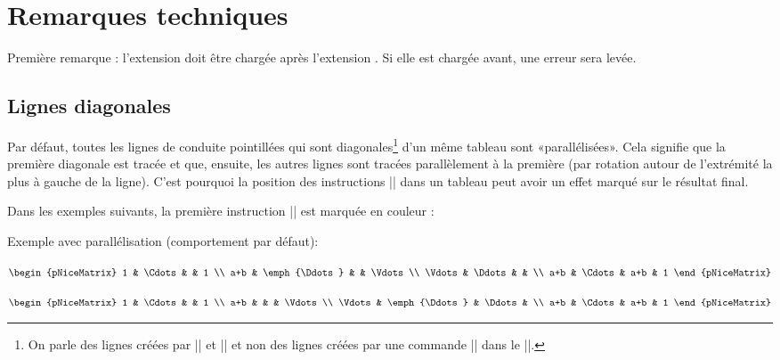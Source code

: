 \documentclass[dvipsnames]{article}
\begin{document}
\section{Remarques techniques}

Première remarque : l'extension  doit être chargée après
l'extension . Si elle est chargée avant, une erreur sera levée.

\subsection{Lignes diagonales}

\label{parallelization}

Par défaut, toutes les lignes de conduite pointillées qui sont
diagonales\footnote{On parle des lignes créées par
  |\Ddots| et |\Iddots| et non des lignes créées par une commande |\line| dans le
  |\CodeAfter|.} d'un même tableau sont «parallélisées». Cela signifie que la
première diagonale est tracée et que, ensuite, les autres lignes sont tracées
parallèlement à la première (par rotation autour de l'extrémité la plus à gauche
de la ligne). C'est pourquoi la position des instructions |\Ddots| dans un
tableau peut avoir un effet marqué sur le résultat final.

\medskip
Dans les exemples suivants, la première instruction |\Ddots| est marquée en couleur :

\medskip
Exemple avec parallélisation (comportement par défaut):

\begin{Code}[width=9.5cm,show-output]
$\begin{pNiceMatrix}
  1      & \Cdots &        & 1      \\
  a+b    & \emph{\Ddots} &        & \Vdots \\
  \Vdots & \Ddots &        &        \\
  a+b    & \Cdots & a+b    & 1
\end{pNiceMatrix}$
\end{Code}

\medskip
\begin{Code}[width=9.5cm,show-output]
$\begin{pNiceMatrix}
  1      & \Cdots &        & 1      \\
  a+b    &        &        & \Vdots \\
  \Vdots & \emph{\Ddots} & \Ddots & \\
  a+b    & \Cdots & a+b    & 1
\end{pNiceMatrix}$
\end{Code}
\end{document}
